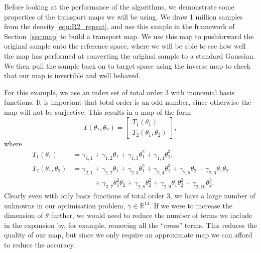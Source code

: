 \documentclass[final]{siamltex}
\begin{document}
Before looking at the performance of the algorithms, we demonstrate some properties of the transport maps we will be using. We draw 1 million samples from the density \eqref{eqn:R2_repeat}, and use this sample in the framework of Section~\ref{sec:map} to build a transport map. We use this map to pushforward the original sample onto the reference space, where we will be able to see how well the map has performed at converting the original sample to a standard Gaussian. We then pull the sample back on to target space using the inverse map to check that our map is invertible and well behaved.

For this example, we use an index set of total order 3 with monomial
basis functions. It is important that total order is an odd number,
since otherwise the map will not be surjective. This results in a map of the form
\begin{equation}
	T(\theta_1, \theta_2) = \begin{bmatrix} T_1(\theta_1) \\ T_2(\theta_1, \theta_2) \end{bmatrix},
\end{equation}
where
\begin{align}
		T_1(\theta_1) &= \gamma_{1,1} + \gamma_{1,2}\theta_1 + \gamma_{1,3}\theta_1^2 + \gamma_{1,4}\theta_1^3, \\
		T_2(\theta_1, \theta_2) &= \gamma_{2,1} + \gamma_{2,2}\theta_1 + \gamma_{2,3}\theta_1^2 + \gamma_{2,4}\theta_1^3
					+ \gamma_{2,5}\theta_2 + \gamma_{2,6}\theta_1\theta_2 \\
				 & \qquad \quad + \gamma_{2,7}\theta_1^2\theta_2 + \gamma_{2,8}\theta_2^2 + \gamma_{2,9}\theta_1\theta_2^2 +
					 \gamma_{2,10}\theta_2^3.
\end{align}
Clearly even with only basis functions of total order 3, we have a large number of unknowns in our optimisation problem, $\bar{\gamma} \in \mathbb{R}^{14}$. If we were to increase the dimension of $\theta$ further, we would need to reduce the number of terms we include in the expansion by, for example, removing all the ``cross'' terms. This reduces the quality of our map, but since we only require an approximate map we can afford to reduce the accuracy.
\end{document}
